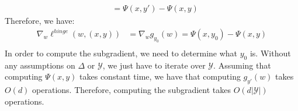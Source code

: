 \documentclass{amsart}
\theoremstyle{definition}
\begin{document}
\begin{enumerate}[(a)]
\begin{align*}
        &= \Psi(x, y') - \Psi(x, y)
      \end{align*}
      Therefore, we have:
      \begin{align*}
        \nabla_w \ell^{hinge}(w, (x,y)) &= \nabla_w g_{y_0}(w) = \Psi(x, y_0) - \Psi(x, y)\\
      \end{align*}
      In order to compute the subgradient, we need to determine what $y_0$ is. Without any assumptions on $\Delta$ or $\mathcal{Y}$, we just have to iterate over $\mathcal{Y}$. 
      Assuming that computing $\Psi(x,y)$ takes constant time, we have that computing $g_{y'}(w)$ takes $O(d)$ operations. Therefore, computing the subgradient takes $O(d|\mathcal{Y}|)$ operations.
\end{enumerate}
\end{document}
